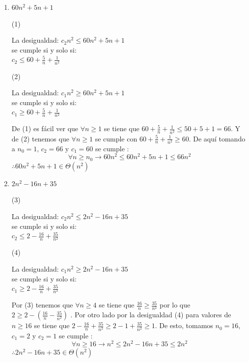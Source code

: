 \documentclass{article}
\begin{document}
\begin{enumerate}

    \item $60n^2 + 5n +1$ \\
    \begin{multicols}{2}
    \begin{center}(1) \end{center}
    La desigualdad: $c_2  n^2 \leq 60n^2 + 5n +1 $ \\
         se cumple si y solo si: \\
         $c_2 \leq 60 + \frac{5}{n} + \frac{1}{n^2}$ 
    \columnbreak
     \begin{center}(2) \end{center}
    La desigualdad: $c_1  n^2 \geq 60n^2 + 5n +1 $ \\
         se cumple si y solo si: \\
         $c_1 \geq 60 + \frac{5}{n} + \frac{1}{n^2}$ 
    \end{multicols}
    De (1) es fácil ver que $\forall n \geq 1$ se tiene que $ 60 + \frac{5}{n} + \frac{1}{n^2} \leq 50+5+1 = 66$. Y de (2) tenemos que $\forall n \geq 1$ se cumple con $60 + \frac{5}{n} + \frac{1}{n^2} \geq 60$. De aquí tomando a $n_0 =1$, $c_2= 66$ y $c_1 = 60$ se cumple :
    \[\forall n \geq n_0 \rightarrow 60n^2 \leq 60n^2 + 5n +1 \leq 66n^2 \]
    $\therefore 60n^2 + 5n +1 \in \Theta(n^2)$
    
    
    \item $2n^2 -16n +35$
    
    \begin{multicols}{2}
    \begin{center}(3) \end{center}
     La desigualdad: $c_2  n^2 \leq  2n^2 -16n +35$ \\
         se cumple si y solo si: \\
         $c_2 \leq 2 - \frac{16}{n} + \frac{35}{n^2}$ 
    \columnbreak
     \begin{center}(4) \end{center}
    La desigualdad: $c_1  n^2 \geq  2n^2 -16n +35$ \\
         se cumple si y solo si: \\
         $c_1 \geq 2 - \frac{16}{n} + \frac{35}{n^2}$ 
    \end{multicols}
    Por (3) tenemos que  $\forall n \geq 4$ se tiene que $\frac{16}{n} \geq \frac{35}{n^2}$ por lo que $2 \geq 2 -(\frac{16}{n} - \frac{35}{n^2})$ .
    Por otro lado por la desigualdad (4) para valores de $n \geq 16$ se tiene que $2 - \frac{16}{n} + \frac{35}{n^2} \geq 2-1+\frac{35}{n^2} \geq 1$.
    De esto, tomamos $n_0 = 16$, $c_1 = 2$ y $c_2 = 1$  se cumple :
    \[\forall n \geq 16 \rightarrow n^2 \leq 2n^2 -16n +35 \leq 2  n^2 \]
    $\therefore2n^2 -16n +35\in \Theta(n^2)$
    

\end{enumerate}
\end{document}
